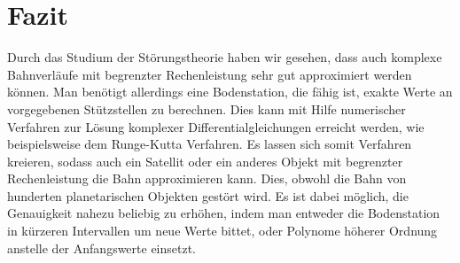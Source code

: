 \section{Fazit}
Durch das Studium der Störungstheorie haben wir gesehen, dass auch komplexe Bahnverläufe mit begrenzter Rechenleistung sehr gut approximiert werden können. Man benötigt allerdings eine Bodenstation, die fähig ist, exakte Werte an vorgegebenen Stützstellen zu berechnen. Dies kann mit Hilfe numerischer Verfahren zur Lösung komplexer Differentialgleichungen erreicht werden, wie beispielsweise dem Runge-Kutta Verfahren. Es lassen sich somit Verfahren kreieren, sodass auch ein Satellit oder ein anderes Objekt mit begrenzter Rechenleistung die Bahn approximieren kann. Dies, obwohl die Bahn von hunderten planetarischen Objekten gestört wird. Es ist dabei möglich, die Genauigkeit nahezu beliebig zu erhöhen, indem man entweder die Bodenstation in kürzeren Intervallen um neue Werte bittet, oder Polynome höherer Ordnung anstelle der Anfangswerte einsetzt.